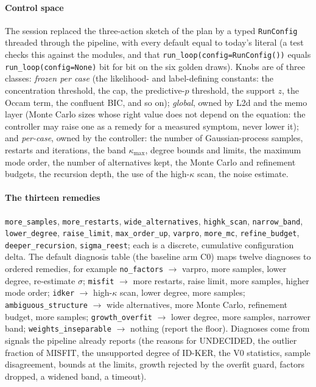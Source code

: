 \documentclass[11pt]{article}
\theoremstyle{plain}
\theoremstyle{definition}
\theoremstyle{remark}
\newcommand{\lab}[1]{\textsf{#1}}           %
\newcommand{\IDK}{\lab{ID-KER}}
\newcommand{\MIS}{\lab{MISFIT}}
\newcommand{\UND}{\lab{UNDECIDED}}
\begin{document}
\paragraph{Control space} The session replaced the three-action sketch of the plan by a typed \texttt{RunConfig} threaded through the pipeline, with every default equal to today's literal (a test checks this against the modules, and that \texttt{run\_loop(config=RunConfig())} equals \texttt{run\_loop(config=None)} bit for bit on the six golden draws).
Knobs are of three classes: \emph{frozen per case} (the likelihood- and label-defining constants: the concentration threshold, the cap, the predictive-$p$ threshold, the support $z$, the Occam term, the confluent BIC, and so on); \emph{global}, owned by L2d and the memo layer (Monte Carlo sizes whose right value does not depend on the equation: the controller may raise one as a remedy for a measured symptom, never lower it);
and \emph{per-case}, owned by the controller: the number of Gaussian-process samples, restarts and iterations, the band $\kappa_{\max}$, degree bounds and limits, the maximum mode order, the number of alternatives kept, the Monte Carlo and refinement budgets, the recursion depth, the use of the high-$\kappa$ scan, the noise estimate.

\paragraph{The thirteen remedies} \texttt{more\_samples}, \texttt{more\_restarts}, \texttt{wide\_alternatives}, \texttt{highk\_scan}, \texttt{narrow\_band}, \texttt{lower\_degree}, \texttt{raise\_limit}, \texttt{max\_order\_up}, \texttt{varpro}, \texttt{more\_mc}, \texttt{refine\_budget}, \texttt{deeper\_recursion}, \texttt{sigma\_reest}; each is a discrete, cumulative configuration delta.
The default diagnosis table (the baseline arm C0) maps twelve diagnoses to ordered remedies, for example \texttt{no\_factors} $\to$ varpro, more samples, lower degree, re-estimate $\sigma$; \texttt{misfit} $\to$ more restarts, raise limit, more samples, higher mode order; \texttt{idker} $\to$ high-$\kappa$ scan, lower degree, more samples;
\texttt{ambiguous\_structure} $\to$ wide alternatives, more Monte Carlo, refinement budget, more samples; \texttt{growth\_overfit} $\to$ lower degree, more samples, narrower band; \texttt{weights\_inseparable} $\to$ nothing (report the floor). Diagnoses come from signals the pipeline already reports (the reasons for \UND, the outlier fraction of \MIS, the unsupported degree of \IDK, the V0 statistics, sample disagreement, bounds at the limits, growth rejected by the overfit guard, factors dropped, a widened band, a timeout).
\end{document}
